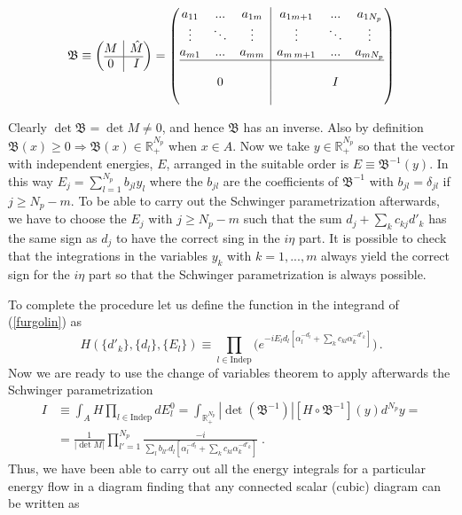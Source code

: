 \documentclass[%
 reprint,
 amsmath,amssymb,
 aps,
]{revtex4-1}
\begin{document}
\[
\mathfrak{B}\equiv\left(\begin{array}{@{}c|c@{}}
M & \hat{M}\\\hline
0 & I
  \end{array}\right)
=  \left(\begin{array}{@{}ccc|ccc@{}}
    a_{11} & ... &a_{1m} & a_{1m+1} & ... & a_{1{N_p}} \\
    \vdots & \ddots& \vdots & \vdots & \ddots& \vdots  \\
   a_{m1} & ... & a_{mm} & a_{m\,m+1} & ... & a_{m{N_p}} \\\hline
     &  &  & & & \\
    & 0 &  &  & I& \\
    &  &  & & &
  \end{array}\right)
  \]

 Clearly $\det{\mathfrak{B}}=\det{M}\neq0$, and hence $\mathfrak{B}$ has an inverse. Also by definition $\mathfrak{B}(x)\geq0\Rightarrow \mathfrak{B}(x)\in \mathbb{R}_+^{N_p}$ when $x\in A$.
 Now we take $y\in \mathbb{R}_+^{N_p}$ so that the vector with independent energies, $E$, arranged in the suitable order is $E\equiv\mathfrak{B}^{-1}(y)$. In this way $E_j=\sum_{l=1}^{N_p} b_{jl}y_l$  where the $b_{jl}$ are the coefficients of $\mathfrak{B}^{-1}$ with $b_{jl}=\delta_{jl}$ if $j\geq N_p-m$. To be able to carry out the Schwinger parametrization afterwards, we have to choose the $E_j$ with $j\geq N_p-m$ such that the sum $d_j+\sum_kc_{kj} d'_k$ has the same sign as $d_j$ to have the correct sing in the $i\eta$ part. 
 It is possible to check that the integrations in the variables $y_k$ with $k=1,...,m$ always yield the correct sign for the $i\eta$ part so that the Schwinger parametrization is always possible. \par
 To complete the procedure let us define the function in the integrand of (\ref{furgolin}) as
 \begin{equation}
 H(\{d'_k\},\{d_l\},\{E_l\})\equiv\prod_{l\in \text{Indep}}\Big(e^{-i E_ld_l[\alpha^{-d_l}_l+\sum_k c_{kl}\alpha_k^{-d'_k}]}\Big)\,.
 \end{equation}
Now we are ready to use the change of variables theorem to apply afterwards the Schwinger parametrization 
\begin{align}
I&\equiv\int_A H \prod_{l\in \text{Indep}}{dE^0_l}=\int_{\mathbb{R}_+^{N_p}}|\det(\mathfrak{B}^{-1})|[H\circ \mathfrak{B}^{-1}](y) d^{N_p}y=\nonumber\\
&=\frac{1}{|\det{M}|}\prod_{l'=1}^{N_p}\frac{-i}{\sum_l b_{ll'}d_l[\alpha^{-d_l}_l+\sum_k c_{kl}\alpha_k^{-d'_k}]}\;.\label{jetoraso}
\end{align}
Thus, we have been able to carry out all the energy integrals for a particular energy flow in a diagram finding that any connected scalar (cubic) diagram can be written as
\end{document}
